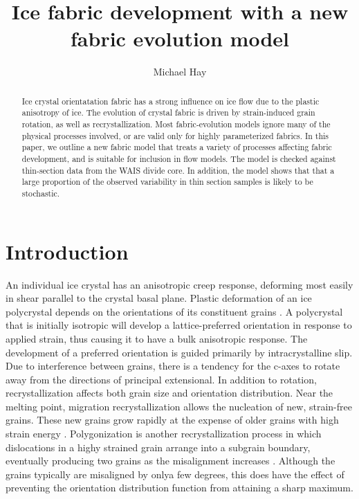 \documentclass[TC, hvmath, online]{copernicus}
\title{Ice fabric development with a new fabric evolution model}
\author{Michael Hay}
\begin{document}
\maketitle

\begin{abstract}
Ice crystal orientatation fabric has a strong influence on ice flow due to the plastic anisotropy of ice. The evolution of crystal fabric is driven by strain-induced grain rotation, as well as recrystallization. Most fabric-evolution models ignore many of the physical processes involved, or are valid only for highly parameterized fabrics. In this paper, we outline a new fabric model that treats a variety of processes affecting fabric development, and is suitable for inclusion in flow models. The model is checked  against thin-section data from the WAIS divide core. In addition, the model shows that that a large proportion of the observed variability in thin section samples is likely to be stochastic. 
\end{abstract}

\section{Introduction}
An individual ice crystal has an anisotropic creep response, deforming most easily in shear parallel to the crystal basal plane. Plastic deformation of an ice polycrystal depends on the orientations of its constituent grains \citep{azuma94}. A polycrystal that is initially isotropic will develop a lattice-preferred orientation in response to applied strain, thus causing it to have a bulk anisotropic response. The development of a preferred orientation is guided primarily by intracrystalline slip. Due to interference between grains, there is a tendency for the c-axes to rotate away from the directions of principal extensional. In addition to rotation, recrystallization affects both grain size and orientation distribution. Near the melting point, migration recrystallization allows the nucleation of new, strain-free grains. These new grains grow rapidly at the expense of older grains with high strain energy \citep{duval1995}. Polygonization is another recrystallization process in which dislocations in a highy strained grain arrange into a subgrain boundary, eventually producing two grains as the misalignment increases \citep{alley97}. Although the grains typically are misaligned by onlya few degrees, this does have the effect of preventing the orientation distribution function from attaining a sharp maximum.
\end{document}
